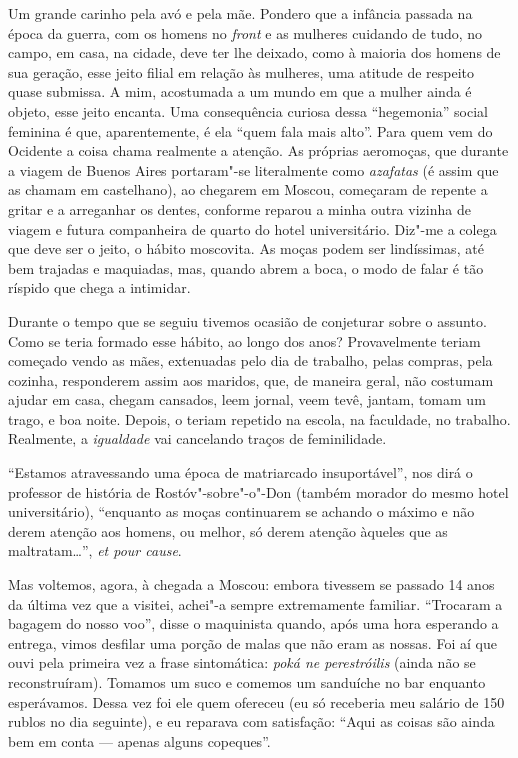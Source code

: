 Um grande carinho pela avó e pela mãe. Pondero que a infância passada na época da guerra, com os homens no \emph{front} e as mulheres cuidando de tudo, no campo, em casa, na cidade, deve ter lhe deixado, como à maioria dos homens de sua geração, esse jeito filial em relação às mulheres, uma atitude de respeito quase submissa. A mim, acostumada a um mundo em que a mulher ainda é objeto, esse jeito encanta. Uma consequência curiosa dessa ``hegemonia'' social feminina é que, aparentemente, é ela ``quem fala mais alto''. Para quem vem do Ocidente a coisa chama realmente a atenção. As próprias aeromoças, que durante a viagem de Buenos Aires portaram"-se literalmente como \emph{azafatas} (é assim que as chamam em castelhano), ao chegarem em Moscou, começaram de repente a gritar e a arreganhar os dentes, conforme reparou a minha outra vizinha de viagem e futura companheira de quarto do hotel universitário. Diz"-me a colega que deve ser o jeito, o hábito moscovita. As moças podem ser lindíssimas, até bem trajadas e maquiadas, mas, quando abrem a boca, o modo de falar é tão ríspido que chega a intimidar.

Durante o tempo que se seguiu tivemos ocasião de conjeturar sobre o assunto. Como se teria formado esse hábito, ao longo dos anos?
Provavelmente teriam começado vendo as mães, extenuadas pelo dia de trabalho, pelas compras, pela cozinha, responderem assim aos maridos, que, de maneira geral, não costumam ajudar em casa, chegam cansados, leem jornal, veem tevê, jantam, tomam um trago, e boa noite. Depois, o teriam repetido na escola, na faculdade, no trabalho. Realmente, a \emph{igualdade} vai cancelando traços de feminilidade.

``Estamos atravessando uma época de matriarcado insuportável'', nos dirá o professor de história de Rostóv"-sobre"-o"-Don (também morador do mesmo hotel universitário), ``enquanto as moças continuarem se achando o máximo e não derem atenção aos homens, ou melhor, só derem atenção àqueles que as maltratam\ldots{}'', \emph{et pour cause}.

Mas voltemos, agora, à chegada a Moscou: embora tivessem se passado 14 anos da última vez que a visitei, achei"-a sempre extremamente familiar. ``Trocaram a bagagem do nosso voo'', disse o maquinista quando, após uma hora esperando a entrega, vimos desfilar uma porção de malas que não eram as nossas. Foi aí que ouvi pela primeira vez a frase sintomática: \emph{poká ne perestróilis} (ainda não se reconstruíram). Tomamos um suco e comemos um sanduíche no bar enquanto esperávamos. Dessa vez foi ele
quem ofereceu (eu só receberia meu salário de 150 rublos no dia seguinte), e eu reparava com satisfação: ``Aqui as coisas são ainda bem em conta --- apenas alguns copeques''.

